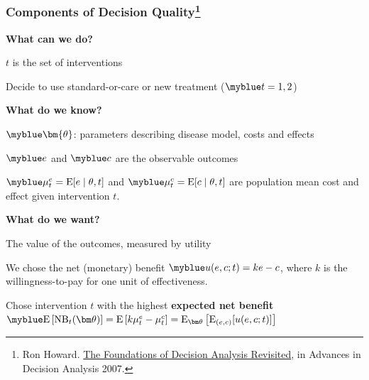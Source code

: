 
\begin{frame}

\frametitle{Components of Decision Quality\footnote{Ron Howard. \href{https://pdfs.semanticscholar.org/b86d/350c0207d1a3ebacc7910a1691e6c091ff46.pdf}{The Foundations of Decision Analysis Revisited}, in Advances in Decision Analysis 2007.}}

\bi
\item \textbf{What can we do?}
\bi
\item $t$ is the set of interventions
\item Decide to use standard-or-care or new treatment ($\myblue t = 1, 2$)
\ei\pause\vspace{5pt}

\item \textbf{What do we know?}
\bi
\item $\myblue \bm{\theta}$: parameters describing  disease model, costs and effects
\item $\myblue e$ and $\myblue c$ are the observable outcomes
\item $\myblue \mu_t^e = \mbox{E}[e\mid\theta, t]$ and $\myblue \mu_t^c= \mbox{E}[c\mid\theta, t]$ are population mean cost and effect given intervention $t$.
\ei\pause\vspace{5pt}

\item \textbf{What do we want?}
\bi
\item The value of the outcomes, \alert{measured by utility}
\item We chose the \alert{net (monetary) benefit} $\myblue u(e,c;t) = ke-c$, where $k$ is the willingness-to-pay for one unit of effectiveness.
\item Chose intervention $t$ with the highest \textbf{expected net benefit}\\
$\myblue \mbox{E}\left[\mbox{NB}_t(\bm\theta)\right] = \mbox{E}\left[k\mu_t^e-\mu_t^c \right] = \mbox{E}_{\bm\theta}\left[ \mbox{E}_{(e,c)}[u(e,c;t)] \right]$\\
\ei
\ei

\end{frame}



